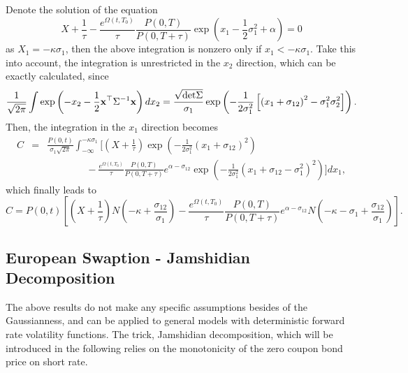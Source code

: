 \documentclass[12pt]{article}
\begin{document}
    Denote the solution of the equation
    \begin{equation}
      X+\frac{1}{\tau}-\frac{e^{\Omega(t,T_0)}}{\tau}\frac{P(0,T)}{P(0,T+\tau)}\exp\left(x_1-\frac{1}{2}\sigma_1^2+\alpha\right)=0
    \end{equation}
    as $X_1=-\kappa\sigma_1$, then the above integration is nonzero only if $x_1<-\kappa\sigma_1$. Take this into account, the integration
    is unrestricted in the $x_2$ direction, which can be exactly calculated, since
    \begin{equation}
      \frac{1}{\sqrt{2\pi}}\int\exp\left(-x_2-\frac{1}{2}{\bf x}^{\top}\Sigma^{-1}{\bf x}\right)dx_2
        = \frac{\sqrt{{\rm det}\Sigma}}{\sigma_1}\exp\left(-\frac{1}{2\sigma_1^2}\left[\left(x_1+\sigma_{12}\right)^2-\sigma_1^2\sigma_2^2\right]\right).
    \end{equation}
    Then, the integration in the $x_1$ direction becomes
    \begin{eqnarray}
      C &=& \frac{P(0,t)}{\sigma_1\sqrt{2\pi}}\int_{-\infty}^{-\kappa\sigma_1}\Bigg[\left(X+\frac{1}{\tau}\right)
                      \exp\left(-\frac{1}{2\sigma_1^2}\left(x_1+\sigma_{12}\right)^2\right) \nonumber\\
        && \quad\quad\quad\quad - \frac{e^{\Omega(t,T_0)}}{\tau}\frac{P(0,T)}{P(0,T+\tau)}e^{\alpha-\sigma_{12}}
                                  \exp\left(-\frac{1}{2\sigma_1^2}\left(x_1+\sigma_{12}-\sigma_1^2\right)^2\right)\Bigg]dx_1,
    \end{eqnarray}
    which finally leads to \cite{MH}
    \begin{equation}
      C = P(0,t)\left[\left(X+\frac{1}{\tau}\right)N\left(-\kappa+\frac{\sigma_{12}}{\sigma_1}\right)
                      -\frac{e^{\Omega(t,T_0)}}{\tau}\frac{P(0,T)}{P(0,T+\tau)}e^{\alpha-\sigma_{12}}
                       N\left(-\kappa-\sigma_1+\frac{\sigma_{12}}{\sigma_1}\right)\right].
    \end{equation}

  \subsection{European Swaption - Jamshidian Decomposition}

  The above results do not make any specific assumptions besides of the Gaussianness, and can be applied to general models with
  deterministic forward rate volatility functions. The trick, Jamshidian decomposition,
  which will be introduced in the following relies on the monotonicity of the zero coupon bond price on short rate.
\end{document}
